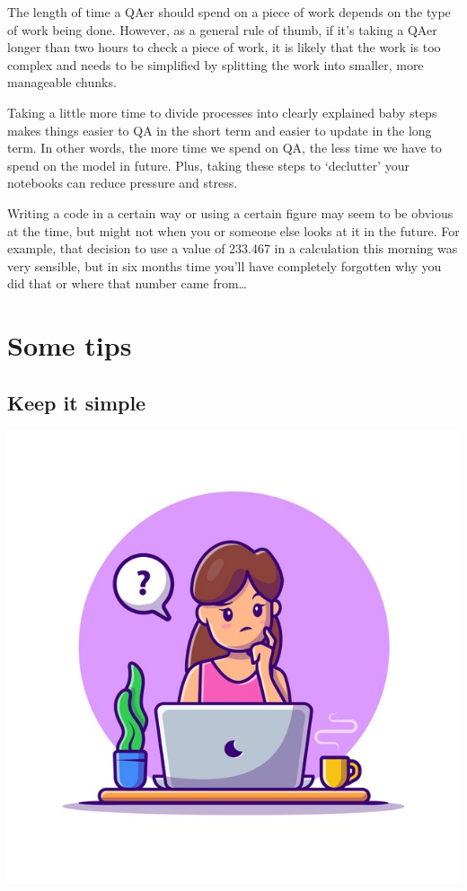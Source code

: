 \documentclass[
]{article}
\begin{document}
The length of time a QAer should spend on a piece of work depends on the type of work being done. However, as a general rule of thumb, if it's taking a QAer longer than two hours to check a piece of work, it is likely that the work is too complex and needs to be simplified by splitting the work into smaller, more manageable chunks.

Taking a little more time to divide processes into clearly explained baby steps makes things easier to QA in the short term and easier to update in the long term. In other words, the more time we spend on QA, the less time we have to spend on the model in future. Plus, taking these steps to `declutter' your notebooks can reduce pressure and stress.

Writing a code in a certain way or using a certain figure may seem to be obvious at the time, but might not when you or someone else looks at it in the future. For example, that decision to use a value of 233.467 in a calculation this morning was very sensible, but in six months time you'll have completely forgotten why you did that or where that number came from\ldots{}

\hypertarget{some-tips}{%
\section{Some tips}\label{some-tips}}

\hypertarget{keep-it-simple}{%
\subsection{Keep it simple}\label{keep-it-simple}}

\includegraphics{pictures/confused_pic.jpg}
\end{document}
